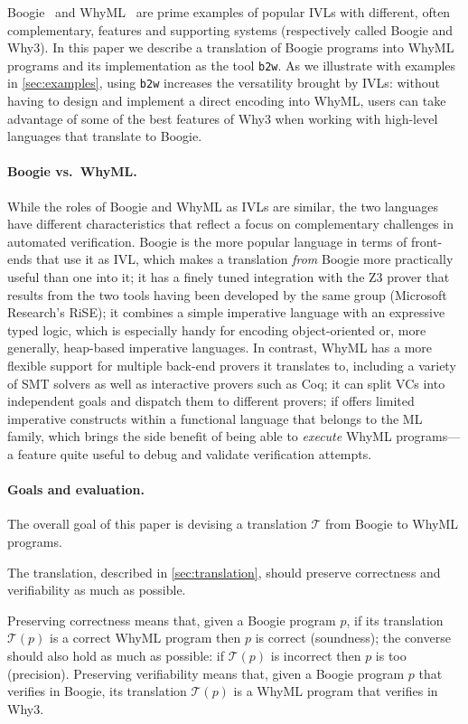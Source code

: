 \documentclass[a4paper,final]{llncs}
\makeatletter
\newif\iflong
\newcommand{\tr}{\mathcal{T}}
\newcommand{\btw}{\texttt{b2w}\xspace}
\newcommand{\Boogie}{Boogie\xspace}
\newcommand{\WhyML}{WhyML\xspace}
\newcommand{\Why}{Why3\xspace}
\newcommand{\tightParagraph}[1]{\paragraph{#1}}
\newcommand\tightParagraph{\@startsection{paragraph}{4}{\z@}{-5\p@ \@plus -4\p@ \@minus -4\p@}{-0.5em \@plus -0.22em \@minus -0.1em}{\normalfont\normalsize\itshape}}
\makeatother
\begin{document}
\Boogie~\cite{boogie-baseref} and \WhyML~\cite{FilliatreP13} are prime examples of popular IVLs with different, often complementary, features and supporting systems (respectively called \Boogie and \Why).
In this paper we describe a translation of \Boogie programs into \WhyML programs and its implementation as the tool \btw.
As we illustrate with examples in \autoref{sec:examples}, using \btw increases the versatility brought by IVLs: without having to design and implement a direct encoding into \WhyML\iflong or even being familiar with its peculiarities\fi, users can take advantage of some of the best features of \Why when working with high-level languages that translate to \Boogie. 




\tightParagraph{\Boogie vs.\ \WhyML.}
While the roles of \Boogie and \WhyML as IVLs are similar, the two languages have different characteristics that reflect a focus on complementary challenges in automated verification.
\Boogie is the more popular language in terms of front-ends that use it as IVL, which makes a translation \emph{from} \Boogie more practically useful than one into it; it has a finely tuned integration with the Z3 prover that results from the two tools having been developed by the same group (Microsoft Research's RiSE); it combines a simple imperative language with an expressive typed logic, which is especially handy for encoding object-oriented or, more generally, heap-based imperative languages.
In contrast, \WhyML has a more flexible support for multiple back-end provers it translates to, including a variety of SMT solvers as well as interactive provers such as Coq; it can split VCs into independent goals and dispatch them to different provers; if offers limited imperative constructs within a functional language that belongs to the ML family, which brings the side benefit of being able to \emph{execute} \WhyML programs---a feature quite useful to debug and validate verification attempts.


\tightParagraph{Goals and evaluation.}
The overall goal of this paper is devising a translation $\tr$ from \Boogie to \WhyML programs.
\iflong
The translation, described in \autoref{sec:translation}, should preserve correctness, verifiability, and readability as much as possible.
\else
The translation, described in \autoref{sec:translation}, should preserve correctness and verifiability as much as possible.
\fi
Preserving correctness means that, given a \Boogie program $p$, if its translation $\tr(p)$ is a correct \WhyML program then $p$ is correct (soundness); the converse should also hold as much as possible: if $\tr(p)$ is incorrect then $p$ is too (precision).
Preserving verifiability means that, given a \Boogie program $p$ that verifies in \Boogie, its translation $\tr(p)$ is a \WhyML program that verifies in \Why.
\iflong
Preserving readability means that the translation should not introduce unnecessary changes in the structure of programs.
\fi
\end{document}

